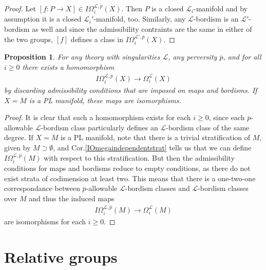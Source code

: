 \documentclass{scrreprt}
\newtheorem{prop}{Proposition}[chapter]
\begin{document}
\begin{proof}
Let $[f: P \to X] \in I \Omega_i^{\mathcal{L}, \overline{p}}(X)$. Then $P$ is a closed $\mathcal{L}_i$-manifold and by assumption it is a closed $\mathcal{L}_i'$-manifold, too. Similarly, any $\mathcal{L}$-bordism is an $\mathcal{L'}$-bordism as well and since the admissibility contraints are the same in either of the two groups, $[f]$ defines a class in $I \Omega_i^{\mathcal{L'}, \overline{p}}(X)$.
\end{proof}

\begin{prop}
For any theory with singularities $\mathcal{L}$, any perversity $\overline{p}$, and for all $i \geq 0$ there exists a homomorphism
\begin{align*}
I \Omega_i^{\mathcal{L}, \overline{p}}(X) \to \Omega_i^{\mathcal{L}}(X)
\end{align*}
by discarding admissibility conditions that are imposed on maps and bordisms. If $X=M$ is a PL manifold, these maps are isomorphisms.
\end{prop}

\begin{proof}
It is clear that such a homomorphism exists for each $i \geq 0$, since each $\overline{p}$-allowable $\mathcal{L}$-bordism class particularly defines an $\mathcal{L}$-bordism class of the same degree. If $X=M$ is a PL manifold, note that there is a trivial stratification of $M$, given by $M \supset \emptyset$, and Cor.\ref{IOmegaindependentstrat} tells us that we can define $I \Omega_i^{\mathcal{L}, \overline{p}}(M)$ with respect to this stratification. But then the admissibility conditions for maps and bordisms reduce to empty conditions, as there do not exist strata of codimension at least two. This means that there is a one-two-one correspondance between $\overline{p}$-allowable $\mathcal{L}$-bordism classes and $\mathcal{L}$-bordism classes over $M$ and thus the induced maps
\begin{align*}
I \Omega_i^{\mathcal{L}, \overline{p}}(M) \to \Omega_i^{\mathcal{L}}(M)
\end{align*}
are isomorphisms for each $i \geq 0$.
\end{proof}

\section{Relative groups}
\end{document}

